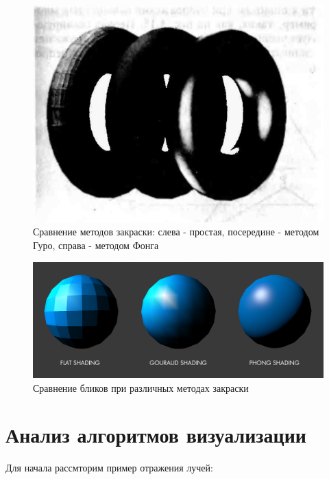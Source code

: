 \documentclass[a4paper,14pt, unknownkeysallowed]{extreport}
\begin{document}
\begin{figure}[H]
	\centering
	\includegraphics{shading_compare}
	\caption{Сравнение методов закраски: слева - простая, посередине - методом Гуро, справа - методом Фонга}
	\label{fig:shading_compare}
\end{figure}

\begin{figure}[H]
	\centering
	\includegraphics[scale=0.3]{reflexion_shading_compare}
	\caption{Сравнение бликов при различных методах закраски}
	\label{fig:reflexion_shading_compare}
\end{figure}






\section[Анализ алгоритмов создания отражений]{Анализ алгоритмов визуализации}

Для начала рассмторим пример отражения лучей:
\end{document}

